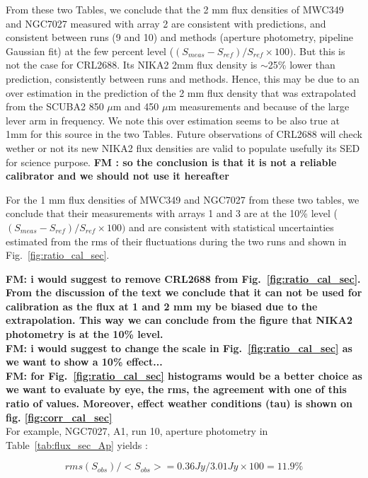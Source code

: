 From these two Tables, we conclude that  the 2 mm flux densities of MWC349 and NGC7027 measured with array 2 are consistent with predictions,
and consistent between runs (9 and 10) and methods (aperture photometry, pipeline Gaussian fit) at the few percent level
($(S_{meas}-S_{ref})/S_{ref} \times 100)$. But this is not the case for CRL2688.  Its NIKA2 2mm
flux density is $\sim$25\% lower than prediction, consistently between runs and methods. Hence, this may be due to an over estimation
in the prediction of the 2 mm flux density that was extrapolated from the SCUBA2 850 $\mu$m and 450 $\mu$m measurements
and because of the large lever arm in frequency. We note this
over estimation seems to be also true at 1mm for this source in the two Tables.
Future observations of CRL2688 will check wether or not its new NIKA2 flux densities are valid to populate usefully its SED
for science purpose. {\bf FM : so the conclusion is that it is not a reliable calibrator and we should not use it hereafter}

For the 1 mm flux densities of MWC349 and NGC7027 from these two tables, we conclude that their  measurements with arrays 1 and 3 are
at the 10\% level   ($(S_{meas}-S_{ref})/S_{ref} \times 100)$  and are consistent with statistical uncertainties estimated from
the rms of their fluctuations
during the two runs and shown in Fig.~\ref{fig:ratio_cal_sec}. 

{\bf FM: i would suggest to remove CRL2688 from Fig.~\ref{fig:ratio_cal_sec}. From the discussion of the text we conclude that it can not be used for calibration as the
    flux at 1 and 2 mm my be biased due to the extrapolation. This way we can conclude from the figure that NIKA2 photometry is at the 10\%
    level.}\\
    
    {\bf FM: i would suggest to change the scale in Fig.~\ref{fig:ratio_cal_sec} as we want to show a 10\% effect...}\\
    
    {\bf FM: for Fig.~\ref{fig:ratio_cal_sec} histograms would be a better choice as we want to evaluate by eye, the rms, the agreement
    with one of this ratio of values. Moreover, effect  weather conditions (tau) is shown on fig. \ref{fig:corr_cal_sec}}\\

For example, NGC7027, A1, run 10, aperture photometry in Table~\ref{tab:flux_sec_Ap}
yields  :

$$rms(S_{obs})/<S_{obs}>=0.36Jy/3.01Jy \times 100=11.9\%$$

